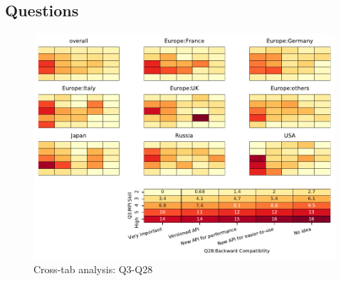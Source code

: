 
\subsection{Questions}


\begin{figure}
\begin{center}
\includegraphics[width=12cm]{../pdfs/Q3-Q28.pdf}
\caption{Cross-tab analysis: Q3-Q28}
\label{fig:Q3-Q28}
\end{center}
\end{figure}

